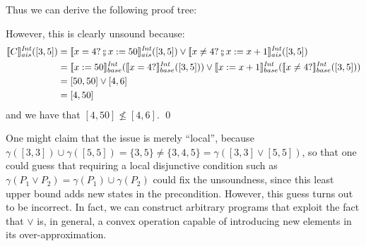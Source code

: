 \documentclass[
  10pt,       %
  twoside,    %
  a4paper,    %
  english,    %
  tikz,       %
  openright,  %
]{book}
\begin{document}
\begin{example}
\noindent
  Thus we can derive the following proof tree:
  \begin{prooftree}
  \end{prooftree}

\noindent
   However, this is clearly unsound because:
  \begin{align*}
    \asem[\mathit{Int}]{C}([3, 5]) &= \asem[\mathit{Int}]{x = 4? \fcmp x := 50}([3, 5])
      \lor \asem[\mathit{Int}]{x \neq 4? \fcmp x := x + 1}([3, 5]) \\
                          &= \bsem{x := 50}^{\mathit{Int}}(\bsem{x = 4?}^{\mathit{Int}}([3, 5]))
      \lor \bsem{x := x + 1}^{\mathit{Int}}(\bsem{x \neq 4?}^{\mathit{Int}}([3, 5])) \\
                          &= [50, 50] \lor [4, 6] \\
                          &= [4, 50]
  \end{align*}
  and we have that $[4, 50] \not \leq [4, 6]$. \qed
\end{example}

One might claim that the issue is merely ``local'', because $\gamma([3,3]) \cup 
\gamma([5,5]) = \{3, 5\} \neq \{3, 4, 5\} = \gamma([3,3] \lor [5,5])$, so that one could guess
that requiring a local disjunctive condition such as 
$\gamma(P_1 \lor P_2) = \gamma(P_1) \cup \gamma(P_2)$ could fix the unsoundness, 
since this least upper bound adds new states in the precondition. However, this 
guess turns out to be incorrect. In fact, we can construct arbitrary programs 
that exploit the 
fact that $\lor$ is, in general, a convex operation capable of introducing new elements
in its over-approximation. 

\end{document}
